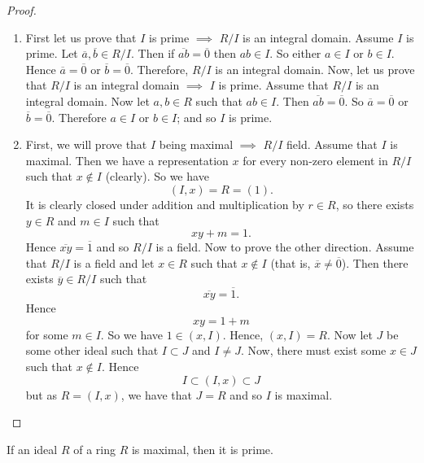 \begin{proof}
    \begin{enumerate}
        \item First let us prove that $I$ is prime 
            $\implies$ $R/I$ is an integral domain.
            Assume $I$ is prime.
            Let $\overline a, \overline b \in R/I$.
            Then if $\overline{ab} = \overline{0}$ then $ab \in I$.
            So either $a \in I$ or $b \in I$.
            Hence $\overline a = \overline 0$ or $\overline b = \overline 0$.
            Therefore, $R/I$ is an integral domain.
            Now, let us prove that $R/I$ is an integral domain 
            $\implies$ $I$ is prime.
            Assume that $R/I$ is an integral domain.
            Now let $a, b \in R$ such that $ab \in I$.
            Then $\overline{ab} = \overline 0$.
            So $\overline a = \overline 0$ or $\overline b = \overline 0$.
            Therefore $a \in I$ or $b \in I$;
            and so $I$ is prime.

        \item First, we will prove that $I$ being maximal
            $\implies$ $R/I$ field.
            Assume that $I$ is maximal. 
            Then we have a representation $x$ for every non-zero element in $R/I$
            such that $x \not\in I$ (clearly).
            So we have
            \[ (I, x) = R = (1). \]
            It is clearly closed under addition and multiplication by $r \in R$,
            so there exists $y \in R$ and $m \in I$ such that
            \[ xy + m = 1. \]
            Hence $\overline{xy} = \overline 1$
            and so $R/I$ is a field.
            Now to prove the other direction.
            Assume that $R/I$ is a field and let $x \in R$ such that $x \not \in I$
            (that is, $\overline x \neq \overline 0$).
            Then there exists $\overline y \in R/I$ such that
            \[ \overline{xy} = \overline 1. \]
            Hence
            \[ xy = 1 + m \]
            for some $m \in I$.
            So we have $1 \in (x, I)$.
            Hence, $(x, I) = R$.
            Now let $J$ be some other ideal such that $I \subset J$ and $I \neq J$.
            Now, there must exist some $x \in J$ such that $x \not \in I$. Hence
            \[ I \subset (I, x) \subset J \]
            but as $R = (I, x)$, we have that $J = R$ and so $I$ is maximal.
    \end{enumerate}
\end{proof}

\begin{lemma}[]
    If an ideal $R$ of a ring $R$ is maximal, then it is prime.
\end{lemma}


